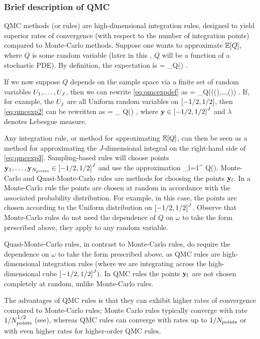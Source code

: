 \subsubsection{Brief description of QMC}

QMC methods (or rules) are high-dimensional integration rules, designed to yield superior rates of convergence (with respect to the number of integration points) compared to Monte-Carlo methods. Suppose one wants to approximate $\EXP{Q},$ where $Q$ is some random variable (later in this , $Q$ will be a function of a stochastic PDE). By definition, the expectation is
\beq\label{eq:qmcexpdef}
 = \int_\Omega Q(\omega) \ddPPomega.
\eeq

If we now suppose $Q$ depends on the sample space via a finite set of random variables $U_{1},\ldots,U_{J}$, then we can rewrite \cref{eq:qmcexpdef} as
\beq\label{eq:qmcexp2}
 = \int_\Omega Q\mleft((\Uo(\omega),\ldots,\UJ(\omega)\mright) \ddPPomega.
\eeq
If, for example, the $U_{j}$ are all Uniform random variables on $\mleft[-1/2,1/2\mright]$, then \cref{eq:qmcexp2} can be rewritten as
\beq\label{eq:qmcexp3}
 = \int_{} Q\mleft(\by\mright) \dd\lambda,
\eeq
where $\by \in \cube{J}$ and $\lambda$ denotes Lebesgue measure.

Any integration rule, or method for approximating $\EXP{Q}$, can then be seen as a method for approximating the $J$-dimensional integral on the right-hand side of \cref{eq:qmcexp3}. Sampling-based rules will choose points $\byo,\ldots,\byNpoints \in \cube{J}$ and use the approximation
\beqs
{} \approx {}\sum_{l=1}^{\Npoints} Q\mleft(\byl\mright).
\eeqs
Monte-Carlo and Quasi-Monte-Carlo rules are methods for choosing the points $\mathbf{y}_{l}$. In a Monte-Carlo rule the points are chosen at random in accordance with the associated probability distribution. For example, in this case, the points are chosen according to the Uniform distribution on $\cube{J}$. Observe that Monte-Carlo rules do not need the dependence of $Q$ on $\omega$ to take the form prescribed above, they apply to any random variable.

Quasi-Monte-Carlo rules, in contrast to Monte-Carlo rules, do require the dependence on $\omega$ to take the form prescribed above, as QMC rules are high-dimensional integration rules (where we are integrating across the high-dimensional cube $\cube{J}).$ In QMC rules the points $\mathbf{y}_{l}$ are not chosen completely at random, unlike Monte-Carlo rules.

The advantages of QMC rules is that they can exhibit higher rates of convergence compared to Monte-Carlo rules; Monte Carlo rules typically converge with rate $1/N_{\mathrm{points}}^{1/2}$ (see), whereas QMC rules can converge with rates up to $1/N_{\mathrm{points}}$ or with even higher rates for higher-order QMC rules.

